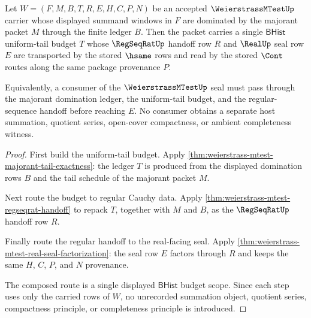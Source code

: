 \begin{theorem}
\label{thm:weierstrass-mtest-uniform-tail-budget-scope}
Let $W=(F,M,B,T,R,E,H,C,P,N)$ be an accepted $\WeierstrassMTestUp$ carrier whose displayed summand windows in $F$ are dominated by the majorant packet $M$ through the finite ledger $B$. Then the packet carries a single $\mathsf{BHist}$ uniform-tail budget $T$ whose $\RegSeqRatUp$ handoff row $R$ and $\RealUp$ seal row $E$ are transported by the stored $\hsame$ rows and read by the stored $\Cont$ routes along the same package provenance $P$.

Equivalently, a consumer of the $\WeierstrassMTestUp$ seal must pass through the majorant domination ledger, the uniform-tail budget, and the regular-sequence handoff before reaching $E$. No consumer obtains a separate host summation, quotient series, open-cover compactness, or ambient completeness witness.
\end{theorem}
\begin{proof}
First build the uniform-tail budget. Apply \autoref{thm:weierstrass-mtest-majorant-tail-exactness}: the ledger $T$ is produced from the displayed domination rows $B$ and the tail schedule of the majorant packet $M$.

Next route the budget to regular Cauchy data. Apply \autoref{thm:weierstrass-mtest-regseqrat-handoff} to repack $T$, together with $M$ and $B$, as the $\RegSeqRatUp$ handoff row $R$.

Finally route the regular handoff to the real-facing seal. Apply \autoref{thm:weierstrass-mtest-real-seal-factorization}: the seal row $E$ factors through $R$ and keeps the same $H$, $C$, $P$, and $N$ provenance.

The composed route is a single displayed $\mathsf{BHist}$ budget scope. Since each step uses only the carried rows of $W$, no unrecorded summation object, quotient series, compactness principle, or completeness principle is introduced.
\end{proof}

